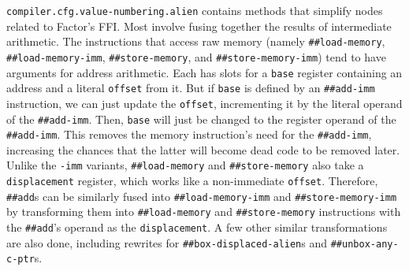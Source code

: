 \begin{sloppypar}
\Verb|compiler.cfg.value-numbering.alien| contains methods that simplify nodes
related to Factor's \gls{FFI}.  Most involve fusing together the results of
intermediate arithmetic.  The instructions that access raw memory (namely
\Verb|##load-memory|, \Verb|##load-memory-imm|, \Verb|##store-memory|, and
\Verb|##store-memory-imm|) tend to have arguments for address arithmetic.  Each
has slots for a \Verb|base| register containing an address and a literal
\Verb|offset| from it.  But if \Verb|base| is defined by an \Verb|##add-imm|
instruction, we can just update the \Verb|offset|, incrementing it by the
literal operand of the \Verb|##add-imm|.  Then, \Verb|base| will just be
changed to the register operand of the \Verb|##add-imm|.  This removes the
memory instruction's need for the \Verb|##add-imm|, increasing the chances that
the latter will become dead code to be removed later.  Unlike the \Verb|-imm|
variants, \Verb|##load-memory| and \Verb|##store-memory| also take a
\Verb|displacement| register, which works like a non-immediate \Verb|offset|.
Therefore, \Verb|##add|s can be similarly fused into \Verb|##load-memory-imm|
and \Verb|##store-memory-imm| by transforming them into \Verb|##load-memory|
and \Verb|##store-memory| instructions with the \Verb|##add|'s operand as the
\Verb|displacement|.  A few other similar transformations are also done,
including rewrites for \Verb|##box-displaced-alien|s and
\Verb|##unbox-any-c-ptr|s.
\end{sloppypar}

